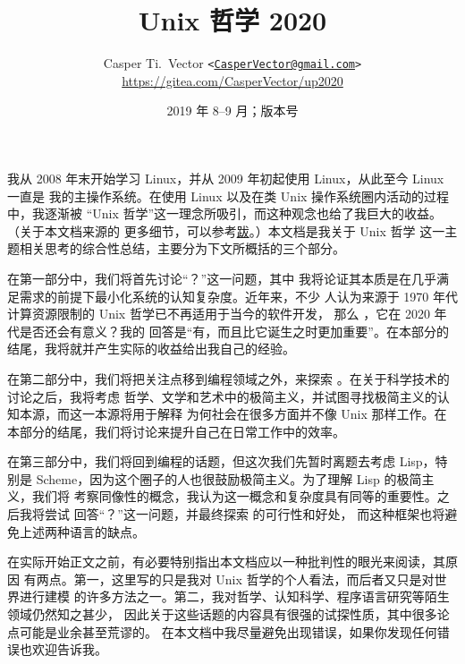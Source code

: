 \documentclass[UTF8]{ctexart}
\begin{document}
\title{\textbf{Unix 哲学 2020}}
\author{%
	Casper Ti.\ Vector
	\texttt{<\url{CasperVector@gmail.com}>}\\
	\url{https://gitea.com/CasperVector/up2020}%
}
\date{2019 年 8--9 月；版本号 \docversion}
\maketitle
\vspace{\baselineskip}
\tableofcontents


我从 2008 年末开始学习 Linux，并从 2009 年初起使用 Linux，从此至今 Linux 一直是
我的主操作系统。在使用 Linux 以及在类 Unix 操作系统圈内活动的过程中，我逐渐被
“Unix 哲学”这一理念所吸引，而这种观念也给了我巨大的收益。（关于本文档来源的
更多细节，可以参考\hyperref[sec:afterword]{跋}。）本文档是我关于 Unix 哲学
这一主题相关思考的综合性总结，主要分为下文所概括的三个部分。

在第一部分中，我们将首先讨论“？”这一问题，其中
我将论证其本质是在几乎满足需求的前提下最小化系统的认知复杂度。近年来，不少
人认为来源于 1970 年代计算资源限制的 Unix 哲学已不再适用于当今的软件开发，
那么 ，它在 2020 年代是否还会有意义？我的
回答是“有，而且比它诞生之时更加重要”。在本部分的结尾，我将就并产生实际的收益给出我自己的经验。

在第二部分中，我们将把关注点移到编程领域之外，来探索 。在关于科学技术的讨论之后，我将考虑
哲学、文学和艺术中的极简主义，并试图寻找极简主义的认知本源，而这一本源将用于解释
为何社会在很多方面并不像 Unix 那样工作。在本部分的结尾，我们将讨论来提升自己在日常工作中的效率。

在第三部分中，我们将回到编程的话题，但这次我们先暂时离题去考虑 Lisp，特别是
Scheme，因为这个圈子的人也很鼓励极简主义。为了理解 Lisp 的极简主义，我们将
考察同像性的概念，我认为这一概念和复杂度具有同等的重要性。之后我将尝试
回答“？”这一问题，并最终探索%
的可行性和好处，
而这种框架也将避免上述两种语言的缺点。

在实际开始正文之前，有必要特别指出本文档应以一种批判性的眼光来阅读，其原因
有两点。第一，这里写的只是我对 Unix 哲学的个人看法，而后者又只是对世界进行建模
的许多方法之一。第二，我对哲学、认知科学、程序语言研究等陌生领域仍然知之甚少，
因此关于这些话题的内容具有很强的试探性质，其中很多论点可能是业余甚至荒谬的。
在本文档中我尽量避免出现错误，如果你发现任何错误也欢迎告诉我。
\end{document}
